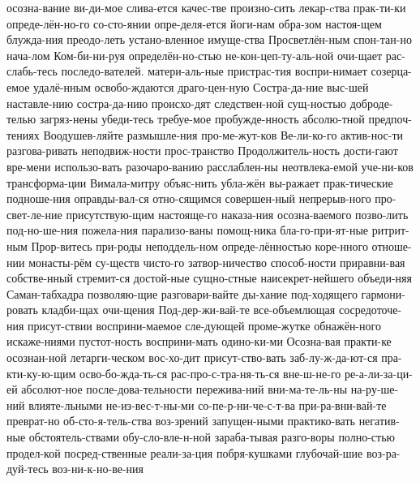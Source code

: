 \documentclass[8pt,twoside]{article}
\begin{document}
{             осозна-вание ви-ди-мое слива-ется качес-тве произно-сить лекар-cтва
             прак-ти-ки опреде-лён-но-го со-сто-янии опре-деля-ется йоги-нам
             обра-зом настоя-щем блужда-ния преодо-леть устано-вленное имуще-ства
             Просветлён-ным спон-тан-но нача-лом Ком-би-ни-руя определён-но-стью
             не-кон-цеп-ту-аль-ной очи-щает рас-слабь-тесь последо-вателей.
             матери-аль-ные пристрас-тия воспри-нимает созерца-емое удалё-нным
             освобо-ждаются драго-цен-ную Состра-да-ние выс-шей наставле-нию
             состра-да-нию происхо-дят следствен-ной сущ-ностью доброде-телью
             загряз-нены убеди-тесь требуе-мое пробужде-нность абсолю-тной
             предпоч-тениях Воодушев-ляйте размышле-ния про-ме-жут-ков
             Ве-ли-ко-го актив-нос-ти разгова-ривать неподвиж-ности прос-транство
             Продолжитель-ность дости-гают вре-мени использо-вать разочаро-ванию
             расслаблен-ны неотвлека-емой уче-ни-ков трансформа-ции
             Вимала-митру объяс-нить убла-жён вы-ражает прак-тические подноше-ния
             оправды-вал-ся отно-сящимся совершен-ный непрерыв-ного
             про-свет-ле-ние присутствую-щим настояще-го наказа-ния осозна-ваемого
             позво-лить под-но-ше-ния пожела-ния парализо-ваны помощ-ника
             бла-го-при-ят-ные ритрит-ным Прор-витесь при-роды неподдель-ном
             опреде-лённостью коре-нного отноше-нии монасты-рём  су-ществ чисто-го
             затвор-ничество способ-ности приравни-вая собстве-нный стремит-ся
             достой-ные сущно-стные наисекрет-нейшего объеди-няя
             Саман-табхадра позволяю-щие разговари-вайте ды-хание
             под-ходящего гармони-ровать кладби-щах очи-щения
             Под-дер-жи-вай-те все-объемлющая сосредоточе-ния присут-ствии
             восприни-маемое сле-дующей проме-жутке обнажён-ного
             искаже-ниями пустот-ность восприни-мать одино-ки-ми
             Осозна-вая практи-ке осознан-ной летарги-ческом вос-хо-дит
             присут-ство-вать заб-лу-ж-да-ют-ся пра-кти-ку-ю-щим
             осво-бо-жда-ть-ся рас-про-с-тра-ня-ть-ся  вне-ш-не-го
             ре-а-ли-за-ци-ей абсолют-ное после-дова-тельности пережива-ний
             вни-ма-те-ль-ны на-ру-ше-ний влияте-льными
             не-из-вес-т-ны-ми со-пе-р-ни-че-с-т-ва
             при-ра-вни-вай-те преврат-но  об-сто-я-тель-ства воз-зрений
             запущен-ными  практико-вать негатив-ные обстоятель-ствами
             обу-сло-вле-н-ной зараба-тывая разго-воры полно-стью
             продел-кой посред-ственные  реали-за-ция побря-кушками
             глубочай-шие воз-ра-дуй-тесь воз-ни-к-но-ве-ния
             }





\end{document}
